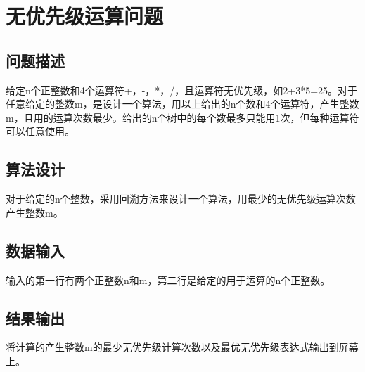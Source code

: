 \documentclass[UTF8]{ctexart}
\begin{document}
    \section{无优先级运算问题}
    \subsection{问题描述}
    给定n个正整数和4个运算符+，-，*，/，且运算符无优先级，如2+3*5=25。对于任意给定的整数m，是设计一个算法，用以上给出的n个数和4个运算符，产生整数m，且用的运算次数最少。给出的n个树中的每个数最多只能用1次，但每种运算符可以任意使用。
    \subsection{算法设计}
    对于给定的n个整数，采用回溯方法来设计一个算法，用最少的无优先级运算次数产生整数m。
    \subsection{数据输入}
    输入的第一行有两个正整数n和m，第二行是给定的用于运算的n个正整数。
    \subsection{结果输出}
    将计算的产生整数m的最少无优先级计算次数以及最优无优先级表达式输出到屏幕上。
\end{document}
